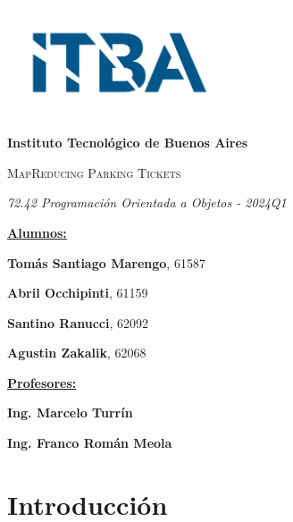 \documentclass[a4paper,12pt]{article}
\begin{document}
	
	\begin{titlepage}
		\centering
			{\includegraphics[width=0.50\textwidth]{LogoITBA}\par}
			{\bfseries\LARGE Instituto Tecnol\'ogico de Buenos Aires \par}
			\vspace{2cm}
			{\scshape\Huge MapReducing Parking Tickets \par}
			\vspace{0.5cm}
			{\itshape\Large 72.42 Programación Orientada a Objetos - 2024Q1 \par}
			\vspace{1cm}
			
			{\Large \textbf{\underline{Alumnos:}} \par}
			{\Large \large \textbf{Tomás Santiago Marengo}, 61587 \par}
			{\Large \large \textbf{Abril Occhipinti}, 61159 \par}	
			{\Large \large \textbf{Santino Ranucci}, 62092 \par}	
			{\Large \large \textbf{Agustin Zakalik}, 62068 \par}	
			
			\vspace{1cm}
			
			{\Large \textbf{\underline{Profesores:}} \par}
			{\Large \large \textbf{Ing. Marcelo Turrín} \par}
			{\Large \large \textbf{Ing. Franco Román Meola} \par}		
			
			\vfill
	\end{titlepage}
	
	\newpage
	\tableofcontents
	\newpage
	
	\section{Introducción}
	
\end{document}
